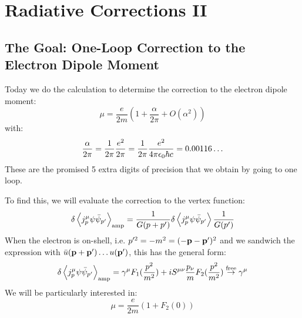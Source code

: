 \section{Radiative Corrections II}

\subsection{The Goal: One-Loop Correction to the Electron Dipole Moment}
Today we do the calculation to determine the correction to the electron dipole moment:
\begin{equation}
    \mu = \frac{e}{2m}(1 + \frac{\alpha}{2\pi} + O(\alpha^2))
\end{equation}
with:
\begin{equation}
    \frac{\alpha}{2\pi} = \frac{1}{2\pi}\frac{e^2}{2\pi} = \frac{1}{2\pi}\frac{e^2}{4\pi \epsilon_0\hbar c} = 0.00116\ldots
\end{equation}
These are the promised 5 extra digits of precision that we obtain by going to one loop.

To find this, we will evaluate the correction to the vertex function:
\begin{equation}
    \delta \left< j^\mu_p \psi \bar{\psi}_{p'} \right>_{\text{amp}} = \frac{1}{G(p + p')}\delta\left< j^\mu_p \psi \bar{\psi}_{p'} \right> \frac{1}{G(p')}
\end{equation}
When the electron is on-shell, i.e. $p'^2 = -m^2 = (-\mathbf{p} - \mathbf{p}')^2$ and we sandwich the expression with $\bar{u}(\mathbf{p} + \mathbf{p}') \ldots u(\mathbf{p}')$,  this has the general form:
\begin{equation}
    \delta \left< j^\mu_p \psi \bar{\psi}_{p'} \right>_{\text{amp}} = \gamma^\mu F_1(\frac{p^2}{m^2}) + iS^{\mu\nu}\frac{p_\nu}{m}F_2(\frac{p^2}{m^2}) \stackrel{\text{free}}{\to} \gamma^\mu
\end{equation}
We will be particularly interested in:
\begin{equation}
    \mu = \frac{e}{2m}\left(1 + F_2(0)\right)
\end{equation}


